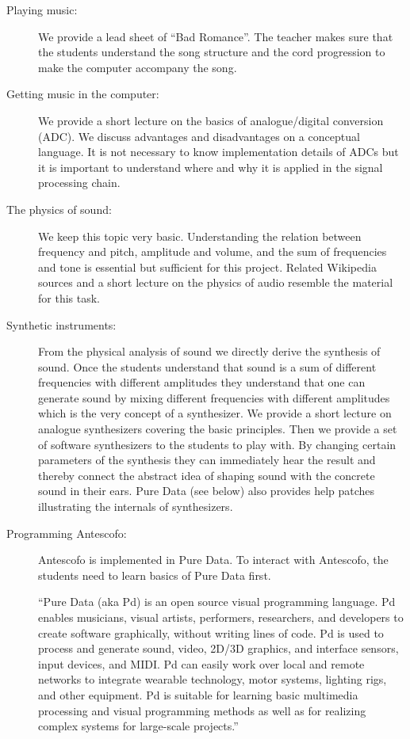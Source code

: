 \documentclass[onecolumn,nocopyrightspace,preprint]{sigplanconf}
\begin{document}
\begin{description}

\item[Playing music:] We provide a lead sheet of ``Bad Romance''. The teacher
makes sure that the students understand the song structure and the cord progression
to make the computer accompany the song. 

\item[Getting music in the computer:] We provide a short lecture on the basics
of analogue/digital conversion (ADC). We discuss advantages and disadvantages
on a conceptual language. It is not necessary to know implementation details
of ADCs but it is important to understand where and why it is applied in the
signal processing chain.

\item[The physics of sound:] We keep this topic very basic. Understanding the
relation between frequency and pitch, amplitude and volume, and the sum of
frequencies and tone is essential but sufficient for this project. Related
Wikipedia sources and a short lecture on the physics of audio resemble the
material for this task.

\item[Synthetic instruments:] From the physical analysis of sound we directly
derive the synthesis of sound. Once the students understand that sound is a
sum of different frequencies  with different amplitudes they understand that
one can generate sound by mixing different frequencies with different
amplitudes which is the very concept of a synthesizer. We provide a short
lecture on analogue synthesizers covering the basic principles. Then we
provide a set of software synthesizers to the students to play with. By
changing certain parameters of the synthesis they can immediately hear the
result and thereby connect the abstract idea of shaping sound with the
concrete sound in their ears. Pure Data (see below) also provides help patches
illustrating the internals of synthesizers.

\item[Programming Antescofo:] Antescofo is implemented in Pure Data. To
interact with Antescofo, the students need to learn basics of Pure Data first.

``Pure Data (aka Pd) is an open source visual programming language. Pd enables
musicians, visual artists, performers, researchers, and developers to create
software graphically, without writing lines of code. Pd is used to process
and generate sound, video, 2D/3D graphics, and interface sensors, input
devices, and MIDI. Pd can easily work over local and remote networks to
integrate wearable technology, motor systems, lighting rigs, and other
equipment. Pd is suitable for learning basic multimedia processing and
visual programming methods as well as for realizing complex systems for
large-scale projects.''~\cite{website:puredata}


\end{description}
\end{document}
